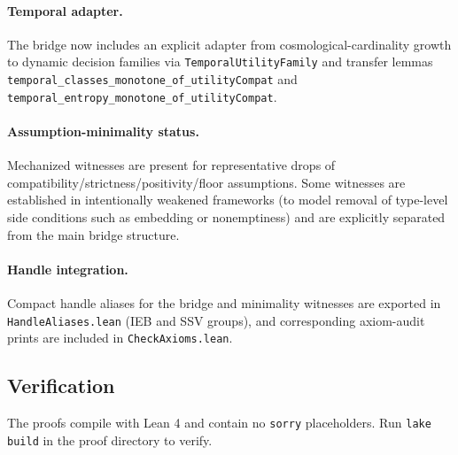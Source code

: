 \paragraph{Temporal adapter.}
The bridge now includes an explicit adapter from cosmological-cardinality growth to dynamic decision families via
\texttt{TemporalUtilityFamily} and transfer lemmas
\texttt{temporal\_classes\_monotone\_of\_utilityCompat} and
\texttt{temporal\_entropy\_monotone\_of\_utilityCompat}.

\paragraph{Assumption-minimality status.}
Mechanized witnesses are present for representative drops of
compatibility/strictness/positivity/floor assumptions.
Some witnesses are established in intentionally weakened frameworks
(to model removal of type-level side conditions such as embedding or nonemptiness)
and are explicitly separated from the main bridge structure.

\paragraph{Handle integration.}
Compact handle aliases for the bridge and minimality witnesses are exported in
\texttt{HandleAliases.lean} (IEB and SSV groups), and corresponding axiom-audit prints are included in
\texttt{CheckAxioms.lean}.

\subsection{Verification}

The proofs compile with Lean 4 and contain no \texttt{sorry} placeholders. Run \texttt{lake build} in the proof directory to verify.
